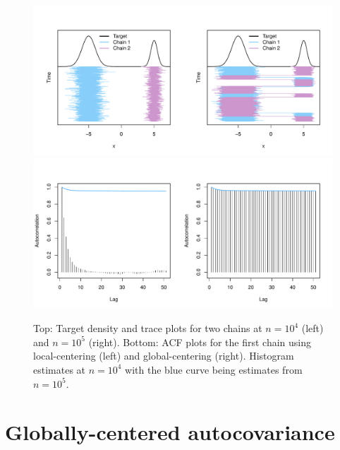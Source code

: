 \documentclass[11pt]{article}
\theoremstyle{remark}
\begin{document}
\begin{figure}[htbp]
\centering
   \includegraphics[width=.62\linewidth]{plots/gaussian-Targettrace.pdf}\\
\vspace{-.5cm}
    \includegraphics[width=.62\textwidth]{plots/gaussian-acf_hist.pdf} 
    \caption{Top: Target density and trace plots for two chains at $n = 10^4$ (left) and $n = 10^5$ (right). Bottom: ACF plots for the first chain using local-centering (left) and global-centering (right). Histogram estimates at $n = 10^4$ with the blue curve being estimates from $n = 10^5$.}
    \label{fig:gaussian-trace}
\end{figure}






\section{Globally-centered autocovariance} \label{sec:G-ACF}
\end{document}
